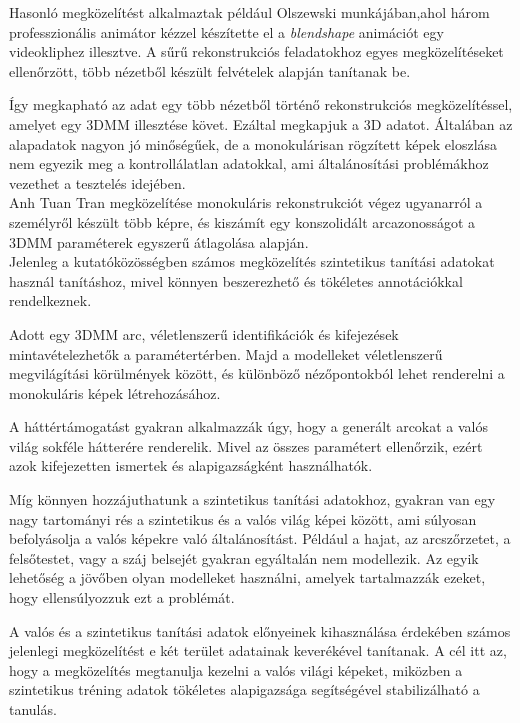 \documentclass[12pt,a4]{article}
\begin{document}
	Hasonló megközelítést alkalmaztak például \cite{olszewski}Olszewski munkájában,ahol három professzionális animátor kézzel készítette el a \textit{blendshape} animációt egy videokliphez illesztve. A sűrű rekonstrukciós feladatokhoz egyes megközelítéseket ellenőrzött, több nézetből készült felvételek alapján tanítanak be.
	
	Így megkapható az adat egy több nézetből történő rekonstrukciós megközelítéssel, amelyet egy 3DMM illesztése követ. Ezáltal megkapjuk a 3D adatot. Általában az alapadatok nagyon jó minőségűek,
	de a monokulárisan rögzített képek eloszlása nem
	egyezik meg a kontrollálatlan adatokkal, ami általánosítási problémákhoz vezethet
	a tesztelés idejében.\\
	
	\cite{tran}Anh Tuan Tran megközelítése monokuláris rekonstrukciót végez ugyanarról a személyről készült több képre, és kiszámít egy konszolidált arcazonosságot a 3DMM paraméterek egyszerű átlagolása alapján. \\
	
	Jelenleg a kutatóközösségben számos megközelítés szintetikus tanítási adatokat használ tanításhoz, mivel könnyen beszerezhető és tökéletes annotációkkal rendelkeznek. 
	
	Adott egy 3DMM arc, véletlenszerű identifikációk és kifejezések mintavételezhetők a paramétertérben. 
	Majd a modelleket véletlenszerű megvilágítási körülmények között, és különböző nézőpontokból lehet renderelni a monokuláris képek létrehozásához. 
	
	A háttértámogatást gyakran alkalmazzák úgy, hogy a generált arcokat a valós világ sokféle hátterére renderelik. Mivel az összes paramétert ellenőrzik, ezért azok kifejezetten ismertek és alapigazságként használhatók.
	
	Míg könnyen hozzájuthatunk a szintetikus tanítási adatokhoz, gyakran van egy nagy tartományi rés
	a szintetikus és a valós világ képei között, ami súlyosan befolyásolja
	a valós képekre való általánosítást. Például a hajat, az arcszőrzetet, a felsőtestet,
	vagy a száj belsejét gyakran egyáltalán nem modellezik. Az egyik lehetőség
	a jövőben olyan modelleket használni, amelyek tartalmazzák ezeket, hogy ellensúlyozzuk ezt a problémát. 
	
	A valós és a szintetikus tanítási adatok előnyeinek kihasználása érdekében számos jelenlegi megközelítést e két terület adatainak keverékével tanítanak. A cél itt az, hogy a megközelítés megtanulja kezelni a valós világi képeket, miközben a szintetikus tréning adatok tökéletes alapigazsága
	segítségével stabilizálható a tanulás.\\
\end{document}
